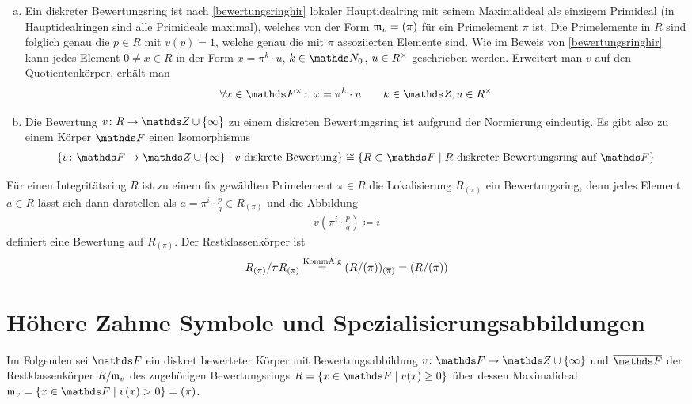 \documentclass[ngerman,fontsize=11pt, paper=a4, parskip=half, titlepage=true, toc=bib]{scrartcl}
\begin{document}
\begin{Bem}\label{darstellungdbk}
  \begin{enumerate}[a)]
  \item Ein diskreter Bewertungsring ist nach \ref{bewertungsringhir}
    lokaler Hauptidealring mit seinem Maximalideal als einzigem 
    Primideal (in Hauptidealringen sind alle Primideale maximal),
    welches von der Form $\mathfrak{m}_v=(\pi)$ für ein Primelement $\pi$ ist.
    Die Primelemente in $R$ sind folglich genau die $p\in R$ mit $v(p)=1$, 
    welche genau die mit $\pi$ assoziierten Elemente sind.
    Wie im Beweis von \ref{bewertungsringhir} kann jedes Element $0\neq x\in R$
    in der Form $x=\pi^k\cdot u$, $k\in\N_0$, $u\in R^\times$ 
    geschrieben werden.
    Erweitert man $v$ auf den Quotientenkörper, erhält man
    \begin{gather*}
      \forall x\in \Fx\colon\;
      x=\pi^k\cdot u
      \qquad k\in\Z, u\in \Rx
    \end{gather*}
  \item Die Bewertung $v\colon R\to\Z\cup\{\infty\}$ zu einem diskreten
    Bewertungsring ist aufgrund der Normierung eindeutig.
    Es gibt also zu einem Körper $\F$ einen Isomorphismus
    \begin{gather*}
      \{v\colon \F\to\Z\cup\{\infty\} 
      \mid \text{$v$ diskrete Bewertung}\}
      \cong 
      \{R\subset \F\mid \text{$R$ diskreter Bewertungsring auf $\F$}\}
    \end{gather*}
  \end{enumerate}
\end{Bem}

\begin{Bsp}\label{p-adischebewertung}
  Für einen Integritätsring $R$ ist zu einem fix gewählten 
  Primelement $\pi\in R$ die Lokalisierung $R_{(\pi)}$ ein 
  Bewertungsring, denn jedes Element
  $a\in R$ lässt sich dann darstellen als $a=\pi^i\cdot \frac{p}{q}\in
  R_{(\pi)}$ und die Abbildung
  \begin{gather*}
    v\left(\pi^i\cdot \frac{p}{q}\right)\coloneqq i
  \end{gather*}
  definiert eine Bewertung auf $R_{(\pi)}$.
  Der Restklassenkörper ist 
  \begin{gather*}
    R_{(\pi)}/\pi R_{(\pi)}
    \overset{\text{KommAlg}}{=}(R/(\pi))_{(\overline{\pi})}
    =(R/(\pi))
  \end{gather*}
\end{Bsp}


\section{Höhere Zahme Symbole und Spezialisierungsabbildungen}
Im Folgenden sei $\F$ ein diskret bewerteter Körper mit
Bewertungsabbildung $v\colon \F\to\Z\cup\{\infty\}$ und
$\overline{\F}$ der Restklassenkörper $R/\mathfrak{m}_v$ 
des zugehörigen Bewertungsrings $R=\left\{x\in\F\mid v(x)\geq0\right\}$
über dessen Maximalideal $\frakm_v=\left\{x\in\F\mid v(x)>0\right\}=(\pi)$.
\end{document}
